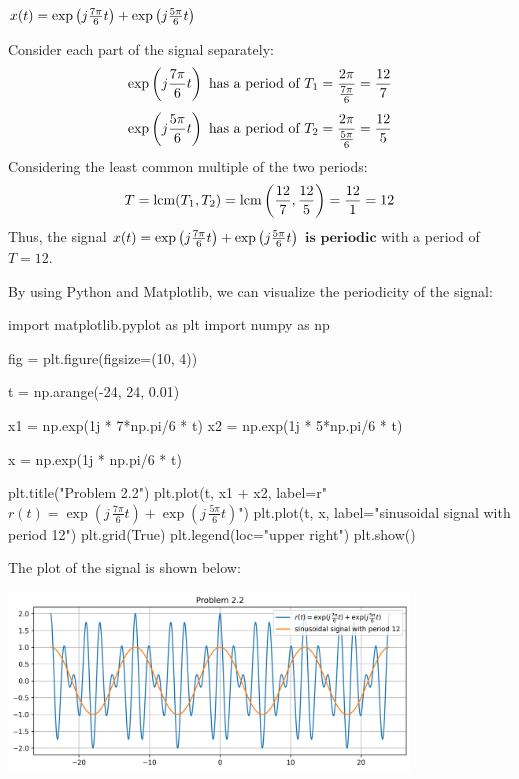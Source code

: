 \documentclass[a4paper, 10pt]{article}
\begin{document}
\newpage

\begin{subproblems}[start=2]
    \item \( x(t) = \exp \left( j\frac{7\pi}{6}t \right) +  \exp \left( j\frac{5\pi}{6}t \right) \)
\end{subproblems}

\begin{solution}
Consider each part of the signal separately:
\[
\exp \left( j\frac{7\pi}{6}t \right) \text{ has a period of } T_1 = \frac{2\pi}{\frac{7\pi}{6}} = \frac{12}{7}
\]
\[
\exp \left( j\frac{5\pi}{6}t \right) \text{ has a period of } T_2 = \frac{2\pi}{\frac{5\pi}{6}} = \frac{12}{5}
\]
Considering the least common multiple of the two periods:
\[
T = \text{lcm}(T_1, T_2) = \text{lcm}\left(\frac{12}{7}, \frac{12}{5}\right) = \frac{12}{1} = 12
\]
Thus, the signal \( x(t) = \exp \left( j\frac{7\pi}{6}t \right) +  \exp \left( j\frac{5\pi}{6}t \right) \) \( \boxed{\textbf{is periodic}} \) with a period of \( \boxed{T = 12} \).

\vspace{5mm}

By using Python and Matplotlib, we can visualize the periodicity of the signal:
\begin{codingbox}
import matplotlib.pyplot as plt
import numpy as np

fig = plt.figure(figsize=(10, 4))

t = np.arange(-24, 24, 0.01)

x1 = np.exp(1j * 7*np.pi/6 * t)
x2 = np.exp(1j * 5*np.pi/6 * t)

x = np.exp(1j * np.pi/6 * t)

plt.title("Problem 2.2")
plt.plot(t, x1 + x2, label=r"$r(t) = \exp(j\,\frac{7\pi}{6}t) + \exp(j\,\frac{5\pi}{6}t)$")
plt.plot(t, x, label="sinusoidal signal with period 12")
plt.grid(True)
plt.legend(loc="upper right")
plt.show()
\end{codingbox}
The plot of the signal is shown below:
\begin{center}
    \includegraphics[width=0.8\textwidth]{images/problem_2_2.png}
\end{center}
\end{solution}
\end{document}
